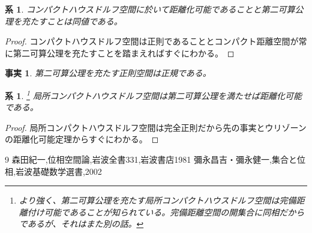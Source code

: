 \documentclass{jsarticle}
\newtheorem{corollary}[theorem]{系}
\newtheorem{fact}[theorem]{事実}
\begin{document}
\begin{corollary}
コンパクトハウスドルフ空間に於いて距離化可能であることと第二可算公理を充たすことは同値である。
\end{corollary}

\begin{proof}
コンパクトハウスドルフ空間は正則であることとコンパクト距離空間が常に第二可算公理を充たすことを踏まえればすぐにわかる。
\end{proof}

\begin{fact}
第二可算公理を充たす正則空間は正規である。
\end{fact}

\begin{corollary}
\footnote{より強く、第二可算公理を充たす局所コンパクトハウスドルフ空間は完備距離付け可能であることが知られている。完備距離空間の開集合に同相だからであるが、それはまた別の話。}
局所コンパクトハウスドルフ空間は第二可算公理を満たせば距離化可能である。
\end{corollary}

\begin{proof}局所コンパクトハウスドルフ空間は完全正則だから先の事実とウリゾーンの距離化可能定理からすぐにわかる。
\end{proof}



\begin{thebibliography}{9}
森田紀一,位相空間論,岩波全書331,岩波書店1981
彌永昌吉・彌永健一,集合と位相,岩波基礎数学選書,2002
\end{thebibliography}
\end{document}
